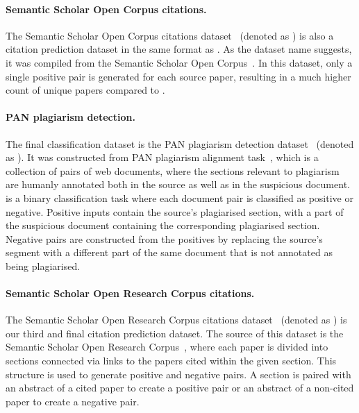 \paragraph{Semantic Scholar Open Corpus citations.} The Semantic Scholar Open
Corpus citations dataset~\citep{zhou2020multilevel} (denoted as ) is
also a citation prediction dataset in the same format as . As the
dataset name suggests, it was compiled from the Semantic Scholar Open
Corpus~\citep{bhagavatula2018content}. In this dataset, only a single positive
pair is generated for each source paper, resulting in a much higher count of
unique papers compared to .

\paragraph{PAN plagiarism detection.} The final classification dataset is the
PAN plagiarism detection dataset~\citep{zhou2020multilevel} (denoted as
). It was constructed from PAN plagiarism alignment
task~\citep{potthast2013overview}, which is a collection of pairs of web
documents, where the sections relevant to plagiarism are humanly annotated both
in the source as well as in the suspicious document.  is a binary
classification task where each document pair is classified as positive or
negative. Positive inputs contain the source's plagiarised section, with a part of
the suspicious document containing the corresponding plagiarised section.
Negative pairs are constructed from the positives by replacing the source's
segment with a different part of the same document that is not annotated as being
plagiarised.

\paragraph{Semantic Scholar Open Research Corpus citations.} The Semantic
Scholar Open Research Corpus citations dataset~\citep{zhou2020multilevel}
(denoted as ) is our third and final citation prediction dataset.
The source of this dataset is the Semantic Scholar Open Research
Corpus~\citep{lo2019s2orc}, where each paper is divided into sections
connected via links to the papers cited within the given section. This structure is
used to generate positive and negative pairs. A section is paired with an
abstract of a cited paper to create a positive pair or an abstract of
a non-cited paper to create a negative pair.


